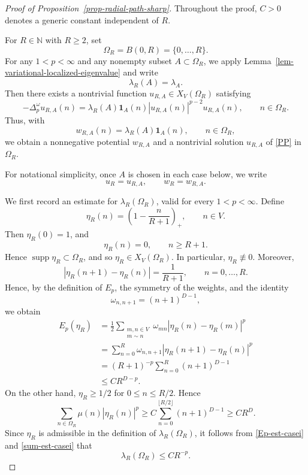 \documentclass[twoside,12pt,letter]{article}
\theoremstyle{plain}
\theoremstyle{definition}
\theoremstyle{remark}
\numberwithin{equation}{section}
\begin{document}
\begin{proof}[Proof of Proposition~\ref{prop-radial-path-sharp}]
Throughout the proof, \(C>0\) denotes a generic constant independent of \(R\).

For \(R\in\mathbb{N}\) with \(R\ge 2\), set
\[
\Omega_R=B(0,R)=\{0,\ldots,R\}.
\]
For any \(1<p<\infty\) and any nonempty subset \(A\subset\Omega_R\), we apply
Lemma~\ref{lem-variational-localized-eigenvalue} and write
\[
\lambda_R(A)=\lambda_A.
\]
Then there exists a nontrivial function \(u_{R,A}\in X_V(\Omega_R)\) satisfying
\[
-\Delta_p^\omega u_{R,A}(n)
=
\lambda_R(A)\mathbf{1}_{A}(n)|u_{R,A}(n)|^{p-2}u_{R,A}(n),
\qquad n\in\Omega_R.
\]
Thus, with
\begin{equation}\label{w-R-A}
w_{R,A}(n)=\lambda_R(A)\mathbf{1}_{A}(n),
\qquad n\in\Omega_R,
\end{equation}
we obtain a nonnegative potential \(w_{R,A}\) and a nontrivial solution
\(u_{R,A}\) of \eqref{PP} in \(\Omega_R\).

For notational simplicity, once \(A\) is chosen in each case below, we write
\[
u_R=u_{R,A},
\qquad
w_R=w_{R,A}.
\]

We first record an estimate for \(\lambda_R(\Omega_R)\), valid for every
\(1<p<\infty\). Define
\[
\eta_R(n)=\left(1-\frac{n}{R+1}\right)_+,
\qquad n\in V.
\]
Then \(\eta_R(0)=1\), and
\[
\eta_R(n)=0,
\qquad n\ge R+1.
\]
Hence \(\operatorname{supp}\eta_R\subset\Omega_R\), and so
\(\eta_R\in X_V(\Omega_R)\). In particular, \(\eta_R\not\equiv 0\). Moreover,
\[
|\eta_R(n+1)-\eta_R(n)|=\frac{1}{R+1},
\qquad n=0,\ldots,R.
\]
Hence, by the definition of \(E_p\), the symmetry of the weights, and the
identity
\[
\omega_{n,n+1}=(n+1)^{D-1},
\]
we obtain
\begin{align}\label{Ep-est-casei}
\nonumber
E_p(\eta_R)
&=
\frac12
\sum_{\substack{m,n\in V\\ m\sim n}}
\omega_{mn}|\eta_R(n)-\eta_R(m)|^p  \\
\nonumber
&=
\sum_{n=0}^{R}\omega_{n,n+1}
|\eta_R(n+1)-\eta_R(n)|^p  \\
\nonumber
&=
(R+1)^{-p}\sum_{n=0}^{R}(n+1)^{D-1}  \\
&\le
C R^{D-p}.
\end{align}
On the other hand, \(\eta_R\ge 1/2\) for \(0\le n\le R/2\). Hence
\begin{equation}\label{sum-est-casei}
\sum_{n\in\Omega_R}\mu(n)|\eta_R(n)|^p
\ge
C\sum_{n=0}^{\lfloor R/2\rfloor}(n+1)^{D-1}
\ge
C R^D.
\end{equation}
Since \(\eta_R\) is admissible in the definition of \(\lambda_R(\Omega_R)\), it
follows from \eqref{Ep-est-casei} and \eqref{sum-est-casei} that
\begin{equation}\label{radial-lambda-full}
\lambda_R(\Omega_R)\le C R^{-p}.
\end{equation}


\end{proof}
\end{document}
